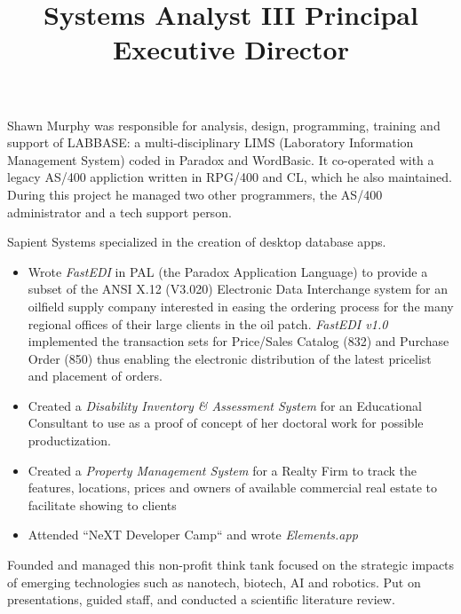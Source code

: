 \documentclass[line,margin,hidelinks]{res}
\begin{document}
\begin{resume}
\begin{position}
\end{position}



\title{Systems Analyst III}
\begin{position}
  Shawn Murphy was responsible for analysis, design, programming, training and support of LABBASE:
  a multi-disciplinary LIMS (Laboratory Information Management System)
  coded in Paradox and WordBasic.
  It co-operated with a legacy AS/400 appliction written in RPG/400 and CL,
  which he also maintained.
  During this project he managed two other programmers, the AS/400 administrator and a
  tech support person.
\end{position}


\title{ Principal }
\begin{position}
Sapient Systems specialized in the creation of desktop database apps.
\begin{itemize}
\item Wrote {\it FastEDI} in PAL (the Paradox Application Language)  to
	provide a subset of the
	ANSI X.12 (V3.020) Electronic Data Interchange system for an
	oilfield supply company interested in easing the ordering process for
	the many regional offices of their large clients in the oil patch.
	{\it FastEDI v1.0} implemented
	the transaction sets for Price/Sales Catalog (832) and
	Purchase Order (850) thus enabling the electronic distribution
	of the latest pricelist and placement of orders.
\item Created a {\it Disability Inventory \& Assessment System }
	for an Educational Consultant to use as a proof of concept of
	her doctoral work for possible productization.
\item Created a {\it Property Management System} for a Realty Firm to
	track the features, locations, prices and owners of
	available commercial real estate to facilitate showing to clients
\item Attended ``NeXT Developer Camp`` and wrote \emph{Elements.app}
\end{itemize}
\end{position}


\title{ Executive Director }
\begin{position}
  Founded and managed this non-profit think tank focused on the strategic impacts of
  emerging technologies such as nanotech, biotech, AI and robotics.
  Put on presentations, guided staff, and conducted a scientific literature review.
\end{position}



\end{resume}
\end{document}
